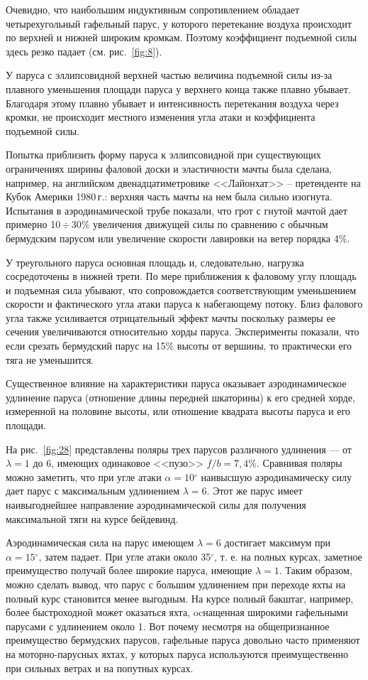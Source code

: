 \documentclass[a4paper, 12pt, twoside, final, book, russian, fittopage, cyremdash]{ncc}
\newcommand{\gr}{\ensuremath{^\circ}\xspace}
\newcommand{\otdo}{\,\ensuremath{\div}\,}
\newcommand{\ris}[1]{\ref{fig:#1}}
\begin{document}
Очевидно, что наибольшим индуктивным сопротивлением обладает четырехугольный гафельный парус, у которого перетекание воздуха происходит по верхней и нижней широким кромкам. Поэтому коэффициент подъемной силы здесь резко падает (см. рис.~\ris{8}).

У паруса с эллипсовидной верхней частью величина подъемной силы из-за плавного уменьшения площади паруса у верхнего конца также плавно убывает. Благодаря этому плавно убывает и интенсивность перетекания воздуха через кромки, не происходит местного изменения угла атаки и коэффициента подъемной силы. 

Попытка приблизить форму паруса к эллипсовидной при существующих ограничениях ширины фаловой доски и эластичности мачты была сделана, например, на английском двенадцатиметровике <<Лайонхат>> \--- претенденте на Кубок Америки 1980\,г.: верхняя часть мачты на нем была сильно изогнута. Испытания в аэродинамической трубе показали, что грот с гнутой мачтой дает примерно 10\otdo 30\% увеличения движущей силы по сравнению с обычным бермудским парусом или увеличение скорости лавировки на ветер порядка 4\%.
 
У треугольного паруса основная площадь и, следовательно, нагрузка сосредоточены в нижней трети. По мере приближения к фаловому углу площадь и подъемная сила убывают, что сопровождается соответствующим уменьшением скорости и фактического угла атаки паруса к набегающему потоку. Близ фалового угла также усиливается отрицательный эффект мачты поскольку размеры ее сечения увеличиваются относительно хорды паруса. Эксперименты показали, что если срезать бермудский парус на 15\% высоты от вершины, то практически его тяга не уменьшится. 

Существенное влияние на характеристики паруса оказывает аэродинамическое удлинение паруса (отношение длины передней шкаторины) к его средней хорде, измеренной на половине высоты, или отношение квадрата высоты паруса и его площади.

На рис.~\ris{28} представлены поляры трех парусов различного удлинения --- от $\lambda = 1$ до 6, имеющих одинаковое <<пузо>> $f/b=7,4\%$. Сравнивая поляры можно заметить, что при угле атаки $\alpha = 10\gr$ наивысшую аэродинамическу силу дает парус с максимальным удлинением $\lambda = 6$. Этот же парус имеет наивыгоднейшее направление аэродинамической силы для получения максимальной тяги на курсе бейдевинд. 

Аэродинамическая сила на парус имеющем $\lambda = 6$ достигает максимум при $\alpha = 15\gr$, затем падает. При угле атаки около 35\gr, т. е. на полных курсах, заметное преимущество получай более широкие паруса, имеющие $\lambda = 1$. Таким образом, можно сделать вывод, что парус с большим удлинением при переходе яхты на полный курс становится менее выгодным. На курсе полный бакштаг, например, более быстроходной может оказаться яхта, ocнащенная широкими гафельными парусами с удлинением около 1. Вот почему несмотря на общепризнанное преимущество бермудских парусов, гафельные паруса довольно часто применяют на моторно-парусных яхтах, у которых паруса используются преимущественно при сильных ветрах и на попутных курсах. 
\end{document}
